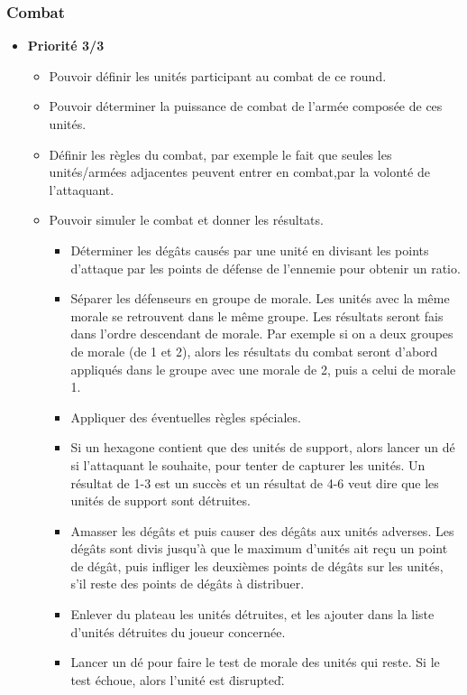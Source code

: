 \subsubsection{Combat}
\begin{itemize}
    \item \textbf{Priorité 3/3}
    \begin{itemize}
        \item Pouvoir définir les unités participant au combat de ce round.
        \item Pouvoir déterminer la puissance de combat de l'armée composée de ces unités.
        \item Définir les règles du combat, par exemple le fait que seules les unités/armées adjacentes peuvent entrer en combat,par la volonté de l'attaquant.
        \item Pouvoir simuler le combat et donner les résultats.
        \begin{itemize}
            \item Déterminer les dégâts causés par une unité en divisant les points d'attaque par les points de défense de l'ennemie pour obtenir un ratio.
            \item Séparer les défenseurs en groupe de morale. Les unités avec la même morale se retrouvent dans le même groupe. Les résultats seront fais dans l'ordre descendant de morale. Par exemple si on a deux groupes de morale (de 1 et 2), alors les résultats du combat seront d'abord appliqués dans le groupe avec une morale de 2, puis a celui de morale 1.
            \item Appliquer des éventuelles règles spéciales.
            \item Si un hexagone contient que des unités de support, alors lancer un dé si l'attaquant le souhaite, pour tenter de capturer les unités. Un résultat de 1-3 est un succès et un résultat de 4-6 veut dire que les unités de support sont détruites.
            \item Amasser les dégâts et puis causer des dégâts aux unités adverses. Les dégâts sont divis jusqu'à que le maximum d'unités ait reçu un point de dégât, puis infliger les deuxièmes points de dégâts sur les unités, s'il reste des points de dégâts à distribuer.
            \item Enlever du plateau les unités détruites, et les ajouter dans la liste d'unités détruites du joueur concernée.
            \item Lancer un dé pour faire le test de morale des unités qui reste. Si le test échoue, alors l'unité est \"disrupted\".

\end{itemize}
\end{itemize}
\end{itemize}

